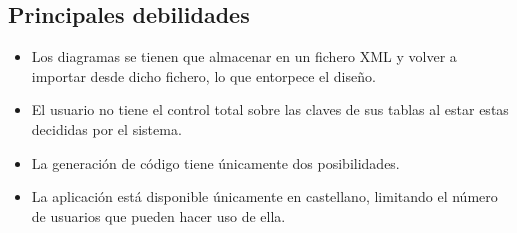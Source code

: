 \subsection{Principales debilidades}

\begin{itemize}
    \item Los diagramas se tienen que almacenar en un fichero XML y volver a importar desde dicho fichero, lo que entorpece el diseño.
    \item El usuario no tiene el control total sobre las claves de sus tablas al estar estas decididas por el sistema.
    \item La generación de código tiene únicamente dos posibilidades.
    \item La aplicación está disponible únicamente en castellano, limitando el número de usuarios que pueden hacer uso de ella.
\end{itemize}